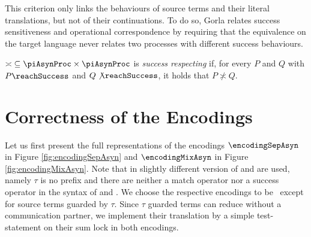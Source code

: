 \documentclass[]{llncs}
\begin{document}
\noindent
This criterion only links the behaviours of source terms and their literal translations, but not of their continuations. To do so, Gorla relates success sensitiveness and operational correspondence by requiring that the equivalence on the target language never relates two processes with different success behaviours.

\begin{definition}
\label{def:successRespecting}
	$ \asymp \; \subseteq \piAsynProc \times \piAsynProc $ is \emph{success respecting} if, for every $ P $ and $ Q $ with $ P \reachSuccess $ and $ Q \not\reachSuccess $, it holds that $ P \not\asymp Q $.
\end{definition}

\section{Correctness of the Encodings} \label{sec:CorrectnessEncodings}

Let us first present the full representations of the encodings $ \encodingSepAsyn $ in Figure \ref{fig:encodingSepAsyn} and $ \encodingMixAsyn $ in Figure \ref{fig:encodingMixAsyn}. Note that in \cite{nestmann00,nestmannPierce00} slightly different version of \piSep and \piAsyn are used, namely $ \tau $ is no prefix and there are neither a match operator nor a success operator in the syntax of \piSep and \piAsyn. We choose the respective encodings to be \clean \ except for source terms guarded by $ \tau $. Since $ \tau $ guarded terms can reduce without a communication partner, we implement their translation by a simple test-statement on their sum lock in both encodings.
\end{document}
